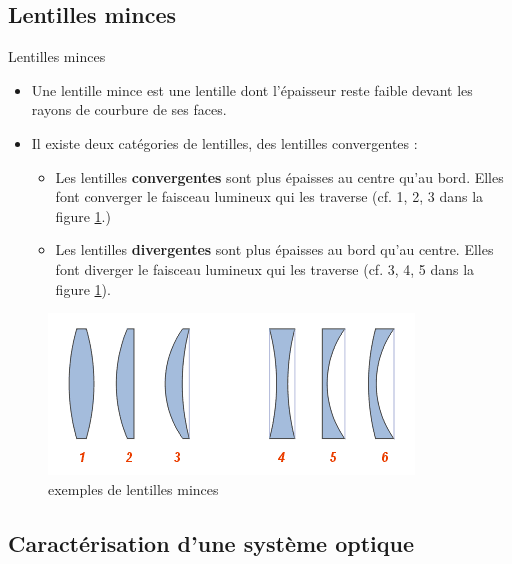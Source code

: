 \documentclass[11pt,a4paper]{article}
\begin{document}
\subsection{Lentilles minces}

\begin{defn}{Lentilles minces}
\begin{itemize}
    \item Une lentille mince est une lentille dont l’épaisseur reste faible devant les rayons de courbure de ses faces.
    \item Il existe deux catégories de lentilles, des lentilles convergentes : 
    \begin{itemize}
        \item Les lentilles \textbf{convergentes} sont plus épaisses au centre qu’au bord.  Elles font converger le faisceau lumineux qui les traverse (cf. 1, 2, 3 dans la figure \ref{fig:lentillemince}.)
        \item Les lentilles \textbf{divergentes} sont plus épaisses au bord qu’au centre.  Elles font diverger le faisceau lumineux qui les traverse (cf. 3, 4, 5 dans la figure \ref{fig:lentillemince}). 
    \end{itemize}
\end{itemize}
\end{defn}

\begin{figure}[h]
    \centering
    \includegraphics[width=0.7\linewidth]{imgs/p6/lentilles minces.png}
    \caption{exemples de lentilles minces}
    \label{fig:lentillemince}
\end{figure}

\subsection{Caractérisation d'une système optique}
\end{document}
